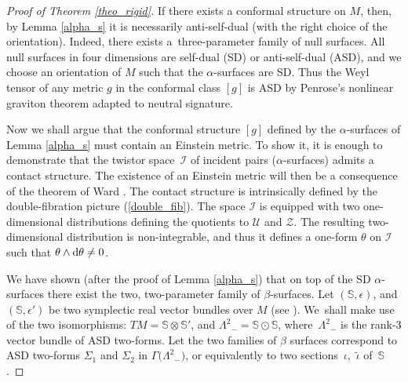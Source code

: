 \documentclass[10pt,a4paper]{article}
\numberwithin{equation}{section}
\newcommand{\Z}{\mathbb{Z}}
\def\I{\mathcal{I}}
\newcommand{\spp}{\mathbb{S}}
\renewcommand{\Z}{\mathcal{Z}}
\newcommand{\U}{\mathcal{U}}
\begin{document}
\begin{proof}[Proof of Theorem \ref{theo_rigid}]
If there exists a conformal structure on $M$, then, by Lemma \ref{alpha_s}
it is necessarily anti-self-dual (with the right choice of the orientation).
Indeed, there exists a~three-parameter family of null surfaces. All null
surfaces in four dimensions are self-dual (SD) or anti-self-dual (ASD), and we choose an orientation
of $M$ such that the $\alpha$-surfaces are SD. Thus the Weyl
tensor of any metric $g$ in the conformal class $[g]$ is ASD by Penrose's nonlinear graviton theorem
\cite{Penrose} adapted to neutral signature.

Now we shall argue that the conformal structure $[g]$ defined
by the $\alpha$-surfaces of Lemma \ref{alpha_s} must contain an Einstein
metric. To show it, it is enough to demonstrate that the twistor
space~$\I$ of incident pairs ($\alpha$-surfaces) admits a contact structure.
The existence of an Einstein metric will then be a consequence of
the theorem of Ward \cite{Ward_cosmo}. The contact
structure is intrinsically defined by the double-fibration picture
(\ref{double_fib}). The space $\I$ is equipped with two one-dimensional
distributions defining the quotients to $\U$ and $\Z$. The resulting
two-dimensional distribution is non-integrable, and thus it defines
a one-form $\theta$ on $\I$ such that $\theta\wedge {\rm d}\theta\neq 0$.

We have shown (after the proof of Lemma \ref{alpha_s}) that
on top of the SD $\alpha$-surfaces there exist the two, two-parameter
family of $\beta$-surfaces.
Let $(\spp, \epsilon)$, and $(\spp, \epsilon')$ be two symplectic
real vector bundles over $M$ (see \cite{ADM, AHS}). We~shall make use of the two isomorphisms: $TM=\spp\otimes \spp'$, and
${\Lambda^2}_-=\spp\odot \spp$, where~${\Lambda^2}_-$ is the rank-3 vector bundle of
ASD two-forms.
Let the two families of
$\beta$ surfaces correspond to ASD two-forms
$\Sigma_1$ and $\Sigma_2$ in $\Gamma\big({\Lambda^2}_-\big)$, or equivalently to two
sections~$\iota$,~$\tilde{\iota}$ of~$\spp$.


\end{proof}
\end{document}

